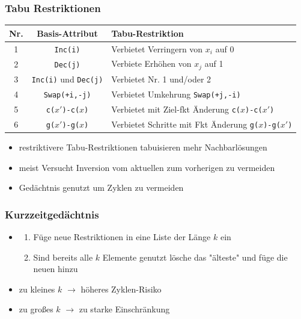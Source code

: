 \documentclass[12pt]{article}
\begin{document}
			\subsubsection{Tabu Restriktionen}
				\begin{tabular}{ c c l}
					Nr. & Basis-Attribut & Tabu-Restriktion \\ \hline
					1 & \texttt{Inc(i)} & Verbietet Verringern von $x_i$ auf 0 \\
					2 & \texttt{Dec(j)} & Verbiete Erhöhen von $x_j$ auf 1 \\
					3 & \texttt{Inc(i)} und \texttt{Dec(j)} & Verbietet Nr. 1 und/oder 2 \\
					4 & \texttt{Swap(+i,-j)} & Verbietet Umkehrung \texttt{Swap(+j,-i)} \\
					5 & \texttt{c($x'$)-c($x$)} & Verbietet mit Ziel-fkt Änderung \texttt{c($x$)-c($x'$)} \\
					6 & \texttt{g($x'$)-g($x$)} & Verbietet Schritte mit Fkt Änderung \texttt{g($x$)-g($x'$)}
				\end{tabular}
				\begin{itemize}
					\item restriktivere Tabu-Restriktionen tabuisieren mehr Nachbarlösungen
					\item meist Versucht Inversion vom aktuellen zum vorherigen zu vermeiden
					\item Gedächtnis genutzt um Zyklen zu vermeiden
				\end{itemize}
			\subsubsection{Kurzzeitgedächtnis}	
				\begin{itemize}
					\item 
						\begin{enumerate}
							\item Füge neue Restriktionen in eine Liste der Länge $k$ ein
							\item Sind bereits alle $k$ Elemente genutzt lösche das "älteste" und füge die neuen hinzu
						\end{enumerate}
					\item zu kleines $k$ $\rightarrow$ höheres Zyklen-Risiko
					\item zu  großes $k$ $\rightarrow$ zu starke Einschränkung
				\end{itemize}
\end{document}
